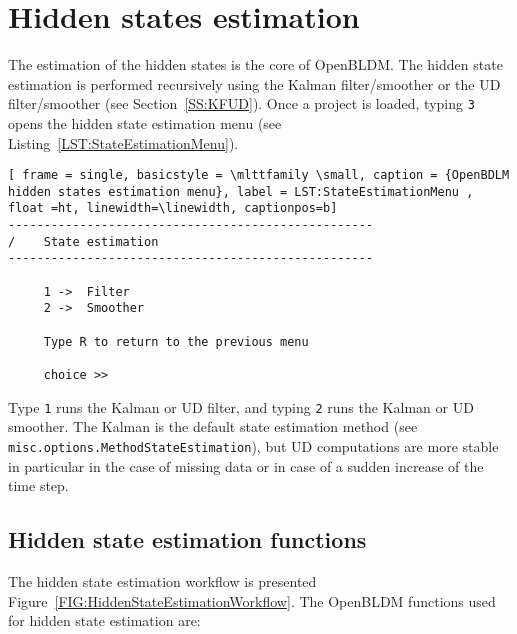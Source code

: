 \section{Hidden states estimation}
\label{S:HIDDENSTATESESTIMATION}

The estimation of the hidden states is the core of OpenBLDM.
The hidden state estimation is performed recursively using the Kalman filter/smoother or the UD filter/smoother (see Section~\ref{SS:KFUD}).
Once a project is loaded, typing \colorbox{light-gray}{\lstinline[basicstyle = \mlttfamily \small ]!3!} opens the hidden state estimation menu (see Listing~\ref{LST:StateEstimationMenu}).

\begin{lstlisting}[ frame = single, basicstyle = \mlttfamily \small, caption = {OpenBDLM hidden states estimation menu}, label = LST:StateEstimationMenu ,  float =ht, linewidth=\linewidth, captionpos=b]
---------------------------------------------------
/    State estimation
---------------------------------------------------

     1 ->  Filter 
     2 ->  Smoother 

     Type R to return to the previous menu 

     choice >> 
\end{lstlisting}

Type  \colorbox{light-gray}{\lstinline[basicstyle = \mlttfamily \small ]!1!} runs the Kalman or UD filter, and typing \colorbox{light-gray}{\lstinline[basicstyle = \mlttfamily \small ]!2!} runs the Kalman or UD smoother.
The Kalman is the default state estimation method (see \lstinline[basicstyle = \mlttfamily \small ]!misc.options.MethodStateEstimation!), but UD computations are more stable in particular in the case of missing data or in case of a sudden increase of the time step.

\subsection{Hidden state estimation functions}

The hidden state estimation workflow is presented Figure~\ref{FIG:HiddenStateEstimationWorkflow}.
The OpenBLDM functions used for hidden state estimation are:


